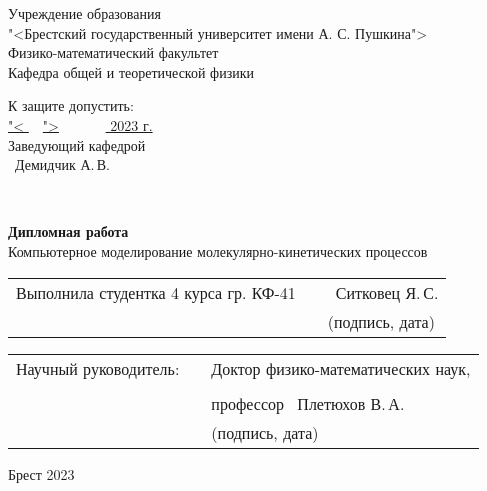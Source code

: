 \thispagestyle{empty}

\begin{center}
    Учреждение образования \\
"<Брестский государственный университет имени А. С. Пушкина"> \\
Физико-математический факультет \\
Кафедра общей и теоретической физики \\


    \vspace{20pt}
\end{center}

\begin{flushright}
    \begin{minipage}{0.4\textwidth}
      К защите допустить:\\[0.1em]
      \underline{"<  $\quad$">\hspace*{0.2 cm}} \underline{$\quad \quad \quad$ 2023 г.\hspace*{0.4 cm}} \\ [0.4 em]
      Заведующий кафедрой \\[0.45em]
      \underline{\hspace*{2.8cm}}~Демидчик А.\,В.
    \end{minipage}\\[2.2em]

  \end{flushright}

\vspace{50pt}

  \begin{center}
    \textbf{Дипломная работа} \\
    \vspace{20pt}
  Компьютерное моделирование молекулярно-кинетических процессов

\end{center}
\vfill
    \vspace{20 pt}

\noindent
\begin{tabular}{lp{0.5em}l}
 Выполнила студентка 4 курса гр. КФ-41   && \hspace{-1 cm} \underline{\hspace{3.6cm}} ~Ситковец Я.\,С. \\                          &&   \hspace{- 0.5 cm} \footnotesize{(подпись, дата)} 
 \end{tabular}

\vspace{10 pt}
 \noindent
 \begin{tabular}{lp{4em}l}
   Научный руководитель:   &&  \hspace{- 1.2 cm} Доктор физико-математических наук, \\ \\
                          &&   \hspace{- 1.2 cm} профессор \underline{\hspace{3.4cm}} ~Плетюхов В.\,А. \\
                          &&   \hspace {1.8 cm}\footnotesize{(подпись, дата)}
 \end{tabular}
 \vfill

 \begin{center}
    {\normalsize Брест 2023}
  \end{center}
